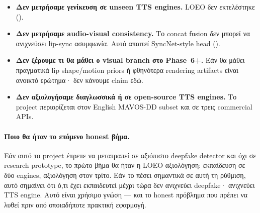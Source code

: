 \begin{itemize}
  \item \textbf{Δεν μετρήσαμε γενίκευση σε unseen TTS engines.}
        LOEO δεν εκτελέστηκε ().

  \item \textbf{Δεν μετρήσαμε audio-visual consistency.}
        Το concat fusion δεν μπορεί να ανιχνεύσει lip-sync ασυμφωνία.
        Αυτό απαιτεί SyncNet-style head ().

  \item \textbf{Δεν ξέρουμε τι θα μάθει ο visual branch στο Phase~6+.}
        Εάν θα μάθει πραγματικά lip shape/motion priors
        ή φθηνότερα rendering artifacts είναι ανοικτό ερώτημα·
        δεν κάνουμε claim εδώ.

  \item \textbf{Δεν αξιολογήσαμε διαγλωσσικά ή σε open-source TTS engines.}
        Το project περιορίζεται στον English MAVOS-DD subset
        και σε τρεις commercial APIs.
\end{itemize}

\paragraph{Ποιο θα ήταν το επόμενο honest βήμα.}

Εάν αυτό το project έπρεπε να μετατραπεί σε αξιόπιστο deepfake detector
και όχι σε research prototype,
το πρώτο βήμα θα ήταν η LOEO αξιολόγηση:
εκπαίδευση σε δύο engines, αξιολόγηση στον τρίτο.
Εάν το \AUC{} πέσει σημαντικά σε αυτή τη ρύθμιση,
αυτό σημαίνει ότι ό,τι έχει εκπαιδευτεί μέχρι τώρα
δεν ανιχνεύει deepfake· ανιχνεύει TTS engine.
Αυτό είναι χρήσιμο γνώση — και το honest πρόβλημα
που πρέπει να λυθεί πριν από οποιαδήποτε πρακτική εφαρμογή.
